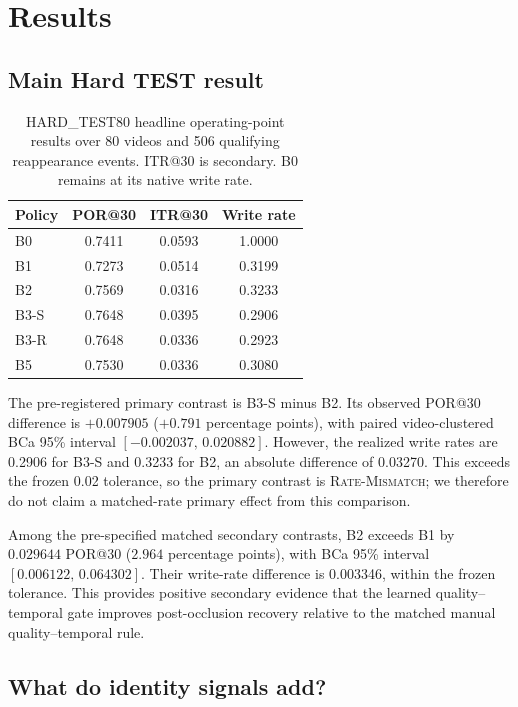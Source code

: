 \documentclass[10pt,twocolumn,letterpaper]{article}
\begin{document}
\section{Results}
\label{sec:results}

\subsection{Main Hard TEST result}

\begin{table}[t]
\centering
\caption{HARD\_TEST80 headline operating-point results over 80 videos and
506 qualifying reappearance events. ITR@30 is secondary. B0 remains at its
native write rate.}
\label{tab:hard-main}
\begin{tabular}{lccc}
\toprule
Policy & POR@30 & ITR@30 & Write rate \\
\midrule
B0   & 0.7411 & 0.0593 & 1.0000 \\
B1   & 0.7273 & 0.0514 & 0.3199 \\
B2   & 0.7569 & 0.0316 & 0.3233 \\
B3-S & 0.7648 & 0.0395 & 0.2906 \\
B3-R & 0.7648 & 0.0336 & 0.2923 \\
B5   & 0.7530 & 0.0336 & 0.3080 \\
\bottomrule
\end{tabular}
\end{table}

The pre-registered primary contrast is B3-S minus B2.  Its observed POR@30
difference is \(+0.007905\) (\(+0.791\) percentage points), with paired
video-clustered BCa 95\% interval
\([-0.002037,\,0.020882]\).  However, the realized write rates are 0.2906
for B3-S and 0.3233 for B2, an absolute difference of 0.03270.  This exceeds
the frozen 0.02 tolerance, so the primary contrast is
\textsc{Rate-Mismatch}; we therefore do not claim a matched-rate primary
effect from this comparison.

Among the pre-specified matched secondary contrasts, B2 exceeds B1 by
\(0.029644\) POR@30 (\(2.964\) percentage points), with BCa 95\% interval
\([0.006122,\,0.064302]\).  Their write-rate difference is 0.003346, within
the frozen tolerance.  This provides positive secondary evidence that the
learned quality--temporal gate improves post-occlusion recovery relative to
the matched manual quality--temporal rule.

\subsection{What do identity signals add?}
\end{document}
